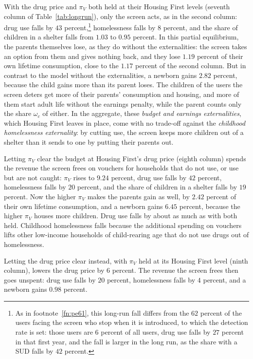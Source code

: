\documentclass[10pt]{article}
\begin{document}
With the drug price and $\pi_V$ both held at their Housing First levels (seventh column of Table~\ref{tab:longrun}), only the screen acts, as in the second column: drug use falls by $43$ percent,\footnote{As in footnote~\ref{fn:pe61}, this long-run fall differs from the $62$ percent of the users facing the screen who stop when it is introduced, to which the detection rate is set: those users are $6$ percent of all users, drug use falls by $27$ percent in that first year, and the fall is larger in the long run, as the share with a SUD falls by $42$ percent.} homelessness falls by $8$ percent, and the share of children in a shelter falls from $1.03$ to $0.95$ percent. In this partial equilibrium, the parents themselves lose, as they do without the externalities: the screen takes an option from them and gives nothing back, and they lose $1.19$ percent of their own lifetime consumption, close to the $1.17$ percent of the second column. But in contrast to the model without the externalities, a newborn gains $2.82$ percent, because the child gains more than its parent loses. The children of the users the screen deters get more of their parents' consumption and housing, and more of them start adult life without the earnings penalty, while the parent counts only the share $\omega_c$ of either. In the aggregate, these \emph{budget and earnings externalities}, which Housing First leaves in place, come with no trade-off against the \emph{childhood homelessness externality}: by cutting use, the screen keeps more children out of a shelter than it sends to one by putting their parents out.

Letting $\pi_V$ clear the budget at Housing First's drug price (eighth column) spends the revenue the screen frees on vouchers for households that do not use, or use but are not caught: $\pi_V$ rises to $9.24$ percent, drug use falls by $42$ percent, homelessness falls by $20$ percent, and the share of children in a shelter falls by $19$ percent. Now the higher $\pi_V$ makes the parents gain as well, by $2.42$ percent of their own lifetime consumption, and a newborn gains $6.45$ percent, because the higher $\pi_V$ houses more children. Drug use falls by about as much as with both held. Childhood homelessness falls because the additional spending on vouchers lifts other low-income households of child-rearing age that do not use drugs out of homelessness.

Letting the drug price clear instead, with $\pi_V$ held at its Housing First level (ninth column), lowers the drug price by $6$ percent. The revenue the screen frees then goes unspent: drug use falls by $20$ percent, homelessness falls by $4$ percent, and a newborn gains $0.98$ percent.
\end{document}
